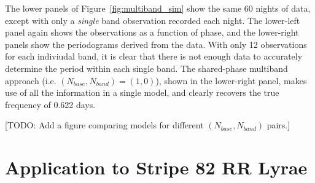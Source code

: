 \documentclass[12pt,preprint]{aastex}
\newcommand{\todo}[1]{{\color{red} [TODO: #1]}}
\newcommand{\Fig}[1]{Figure~\ref{fig:#1}}
\newcommand{\fig}[1]{\Fig{#1}}
\newcommand{\Sect}[1]{Section~\ref{sect:#1}}
\newcommand{\sect}[1]{\Sect{#1}}
\begin{document}
The lower panels of \fig{multiband_sim} show the same 60 nights of data, except with only a {\it single} band observation recorded each night. The lower-left panel again shows the observations as a function of phase, and the lower-right panels show the periodograms derived from the data. With only 12 observations for each indiviudal band, it is clear that there is not enough data to accurately determine the period within each single band. The shared-phase multiband approach (i.e. $(N_{base},N_{band})=(1,0)$), shown in the lower-right panel, makes use of all the information in a single model, and clearly recovers the true frequency of 0.622 days.

\todo{Add a figure comparing models for different $(N_{base},N_{band})$ pairs.}



\section{Application to Stripe 82 RR Lyrae}
\end{document}
